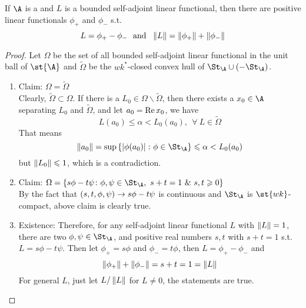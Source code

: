 \begin{thm} 
	If $\A$ is a \Cs and $L$ is a bounded self-adjoint linear functional, then there are positive linear functionals $\phi_{+}$ and $\phi_{-}$ s.t. 
	\begin{equation*}
		L = \phi_{+} - \phi_{-} ~~\text{and}~~ \left\lVert L\right\lVert = \left\lVert\phi_{+}\right\lVert+\left\lVert\phi_{-}\right\lVert
	\end{equation*}
\end{thm}
\begin{proof}
	Let $\Omega$ be the set of all bounded self-adjoint linear functional in the unit ball of $\st{\A}$ and $\tilde{\Omega}$ be the $wk^{*}$-closed convex hull of $\St_{\A}\cup (-\St_{\A})$.
	\begin{enumerate}[label=\arabic*)]
		\item Claim: $\Omega = \tilde{\Omega}$ \\
		Clearly, $\tilde{\Omega} \subset \Omega$. If there is a $L_0 \in \Omega \backslash \tilde{\Omega}$, then there exists a $x_0 \in \A$ separating $L_0$ and $\tilde{\Omega}$, and let $a_0 = \operatorname{Re}{x_0}$, we have
		\begin{equation*}
			L(a_0) \leqslant \alpha < L_0(a_0),~~\forall~L \in \tilde{\Omega}
		\end{equation*}
		That means 
		\begin{equation*}
			\norm{a_0}=\sup{\{\abs{\phi(a_0)} \colon \phi \in \St_{\A}\}} \leqslant \alpha < L_0(a_0)
		\end{equation*}
		but $\left\lVert L_0\right\lVert \leqslant 1$, which is a contradiction.
		\item Claim: $\Omega = \{ s\phi-t\psi \colon \phi,\psi \in \St_{\A},~s+t = 1 ~\&~ s,t \geqslant 0\}$ \\
		By the fact that $(s,t,\phi,\psi) \rightarrow s\phi-t\psi$ is continuous and $\St_{\A}$ is $\st{wk}$-compact, above claim is clearly true.
		\item Existence: Therefore, for any self-adjoint linear functional $L$ with $\left\lVert L\right\lVert = 1$, there are two $\phi,\psi \in \St_{\A}$, and positive real numbers $s,t$ with $s+t=1$ s.t. $L=s\phi-t\psi$. Then let $\phi_{+} = s\phi$ and $\phi_{-}=t\phi$, then $L = \phi_{+} - \phi_{-}$ and
		\begin{equation*}
			\left\lVert\phi_{+}\right\lVert+\left\lVert\phi_{-}\right\lVert= s+t = 1 = \left\lVert L\right\lVert
		\end{equation*}
	For general $L$, just let $L / \left\lVert L\right\lVert$ for $L \neq 0$, the statements are true. \qedhere
	\end{enumerate}
\end{proof}

